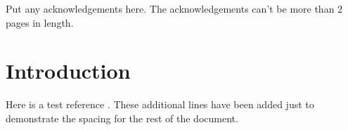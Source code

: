 \documentclass[12pt]{report}          %
\begin{document}
\begin{acknowledgements} 
Put any acknowledgements here.
The acknowledgements can't be more than 2 pages in length.
\end{acknowledgements}

\singlespacing %
               
\tableofcontents
\listoftables  %
\listoffigures %
               
               
\doublespacing



\setforbodyoftext %


\chapter{Introduction}

Here is a test reference \cite{Knuth68:art_of_programming}.
These additional lines have been added just to demonstrate the spacing for the rest of the document.
\end{document}
